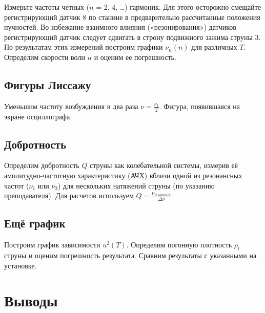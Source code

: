 \documentclass[12pt,a4paper]{article}
\begin{document}
Измерьте частоты четных ($n$ = 2, 4, …) гармоник. Для этого осторожно смещайте регистрирующий датчик 8 по станине в предварительно рассчитанные положения пучностей. Во избежание взаимного влияния («резонирования») датчиков регистрирующий датчик следует сдвигать в строну подвижного зажима струны 3.\\

По результатам этих измерений построим графики $\nu_{n}(n)$ для различных $T$. Определим скорости волн $n$ и оценим ее погрешность. 


\subsection{Фигуры Лиссажу}
Уменьшим частоту возбуждения в два раза $\nu=\frac{\nu_{1}}{2}$. Фигура, появившаяся на экране осциллографа. 


\subsection{Добротность}
Определим добротность $Q$ струны как колебательной системы, измерив её амплитудно-частотную характеристику (АЧХ) вблизи одной из резонансных частот ($\nu_{1}$ или $\nu_{3}$) для нескольких натяжений струны (по указанию преподавателя).
Для расчетов используем $Q=\frac{\nu_{resonance}}{\Delta\nu}$


\subsection{Ещё график}
Построим график зависимости $u^2(T)$. Определим погонную плотность $\rho_{l}$ струны и оценим погрешность результата. Сравним результаты с указанными на установке.


\section{Выводы}
\end{document}
